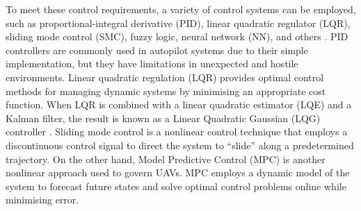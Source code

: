 To meet these control requirements, a variety of control systems can be employed, such as proportional-integral derivative (PID), linear quadratic regulator (LQR), sliding mode control (SMC), fuzzy logic, neural network (NN), and others \cite{li8}. PID controllers are commonly used in autopilot systems due to their simple implementation, but they have limitations in unexpected and hostile environments. Linear quadratic regulation (LQR) provides optimal control methods for managing dynamic systems by minimising an appropriate cost function. When LQR is combined with a linear quadratic estimator (LQE) and a Kalman filter, the result is known as a Linear Quadratic Gaussian (LQG) controller \cite{li9}. Sliding mode control is a nonlinear control technique that employs a discontinuous control signal to direct the system to ``slide'' along a predetermined trajectory. On the other hand, Model Predictive Control (MPC) is another nonlinear approach used to govern UAVs. MPC employs a dynamic model of the system to forecast future states and solve optimal control problems online while minimising error. 

